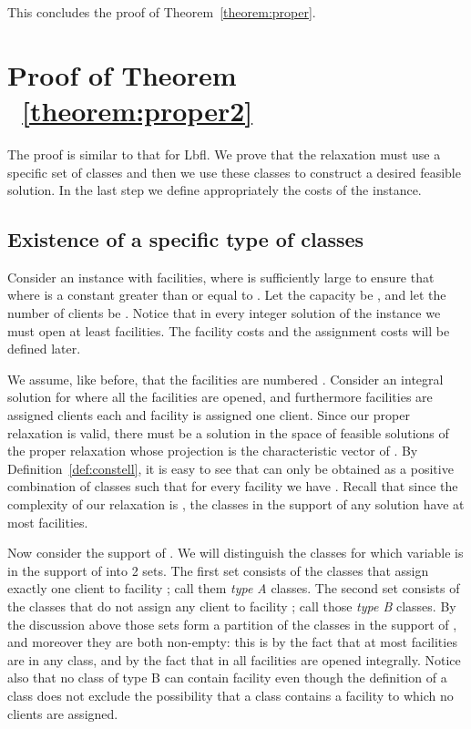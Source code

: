 \documentclass[11pt]{article}\usepackage{amsmath}
\newcommand{\lbfl}{{\sc Lbfl}}
\begin{document}
This concludes the proof of Theorem~\ref{theorem:proper}. 




\section{Proof of Theorem ~\ref{theorem:proper2}} 
\label{sec:proof_theorem_p2}

The proof is similar to that for \lbfl. 
We prove that the relaxation must use 
a specific set of classes and then we use these classes to construct a
desired feasible solution. In the last step we 
 define appropriately  the costs of the instance. 

\subsection{Existence of a specific type of classes}

Consider
an instance  with  facilities, where  is
sufficiently large to ensure  that   where
  is a
constant greater than or equal to  . Let the capacity be , and let
the number of  clients be . Notice that in every integer solution of the instance
 we must open  at least  facilities. The  facility costs  and the assignment  costs will  be defined
later.  

 We  assume, like before, that  the  facilities are  numbered
. 
Consider  an  integral  solution    for    where  all the
facilities  are opened, and furthermore 
facilities   are assigned  clients each 
and facility  is assigned one client. 
Since our proper  relaxation is valid, there must be a solution  in the  space of
feasible solutions of the proper relaxation whose  projection is the characteristic 
vector of .  
By Definition~\ref{def:constell},
it is easy to see that  can only be obtained as a 
positive combination of classes  such that for
every    facility       we   have    .  Recall  that  since  the  complexity  of  our
relaxation is , the classes in the support of any solution 
have at most 
facilities. 

Now consider the support  of . We will distinguish the classes  for
which variable  is in the support of  into 2 sets. The first set consists 
of the classes that assign exactly one client to facility ; call them \emph{type A} classes.
The second set  consists  of the classes that do not assign any client to facility 
; call those \emph{type B} classes. By the discussion above those sets form a
partition of the classes in the support of , and moreover they are both non-empty: this is
 by the fact that at most   facilities are in any class, and by the fact
 that in  all  
facilities are opened integrally. Notice also that no  class
of type B can contain facility  even though the definition of a class does not
exclude the possibility that a class contains a facility to which no clients are
assigned. 
\end{document}
